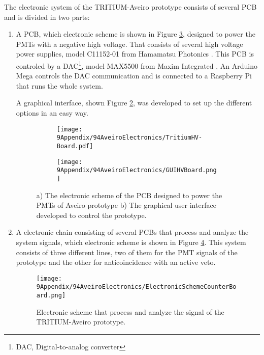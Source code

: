 The electronic system of the TRITIUM-Aveiro prototype consists of several PCB and is divided in two parts:
\begin{enumerate}
\item{} A PCB, which electronic scheme is shown in Figure \ref{fig:HVElectronicAveiro}, designed to power the PMTs with a negative high voltage. That consists of several high voltage power supplies, model C11152-01 from Hamamatsu Photonics \cite{PowerSupplyAveiroDataSheet}. This PCB is controled by a DAC\footnote{DAC, Digital-to-analog converter}, model MAX5500 from Maxim Integrated \cite{MAX5500DataSheet}. An Arduino Mega controls the DAC communication and is connected to a Raspberry Pi that runs the whole system.

A graphical interface, shown Figure \ref{subfig:GUI}, was developed to set up the different options in an easy way.

\begin{figure}
\centering
    \begin{subfigure}[b]{0.45\textwidth}
    \centering
    \texttt{[image: 9Appendix/94AveiroElectronics/TritiumHV-Board.pdf]}  
    \caption{\label{subfig:ElectronicSchemeHVBoard}}
    \end{subfigure}
    \hfill
    \begin{subfigure}[b]{0.45\textwidth}
    \centering
    \texttt{[image: 9Appendix/94AveiroElectronics/GUIHVBoard.png]}  
    \caption{\label{subfig:GUI}}
    \end{subfigure}
 \caption{a) The electronic scheme of the PCB designed to power the PMTs of Aveiro prototype b) The graphical user interface developed to control the prototype.}
 \label{fig:HVElectronicAveiro}
\end{figure}

\item{} A electronic chain consisting of several PCBs that process and analyze the system signals, which electronic scheme is shown in Figure \ref{fig:ElectronicSchemCounterBoard}. This system consists of three different lines, two of them for the PMT signals of the prototype and the other for anticoincidence with an active veto.

\begin{figure}[h]
\centering
\texttt{[image: 9Appendix/94AveiroElectronics/ElectronicSchemeCounterBoard.png]}
\caption{Electronic scheme that process and analyze the signal of the TRITIUM-Aveiro prototype. \label{fig:ElectronicSchemCounterBoard}}
\end{figure}


\end{enumerate}
